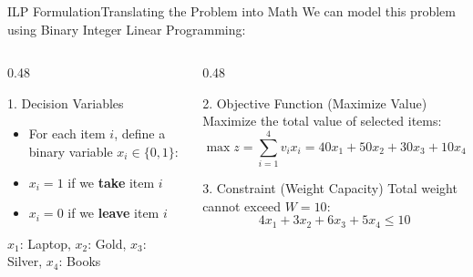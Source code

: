 \documentclass[aspectratio=169]{beamer}
\begin{document}
\begin{frame}{ILP Formulation}{Translating the Problem into Math}
    We can model this problem using Binary Integer Linear Programming:

    \begin{columns}[T]
        \begin{column}{0.48\textwidth}
            \begin{block}{1. Decision Variables}
                \begin{itemize}
                    \item For each item $i$, define a binary variable $x_i \in \{0, 1\}$:
                    \item $x_i = 1$ if we \textbf{take} item $i$
                    \item $x_i = 0$ if we \textbf{leave} item $i$
                \end{itemize}
                \vspace{0.4em}
                \centering
                \footnotesize $x_1$: Laptop,\; $x_2$: Gold,\; $x_3$: Silver,\; $x_4$: Books
            \end{block}
        \end{column}
        \begin{column}{0.48\textwidth}
            \begin{block}{2. Objective Function (Maximize Value)}
                Maximize the total value of selected items:
                \[ \max z = \sum_{i=1}^{4} v_i x_i = 40x_1 + 50x_2 + 30x_3 + 10x_4 \]
            \end{block}
            \begin{block}{3. Constraint (Weight Capacity)}
                Total weight cannot exceed $W = 10$:
                \[ 4x_1 + 3x_2 + 6x_3 + 5x_4 \le 10 \]
            \end{block}
        \end{column}
    \end{columns}
\end{frame}
\end{document}
